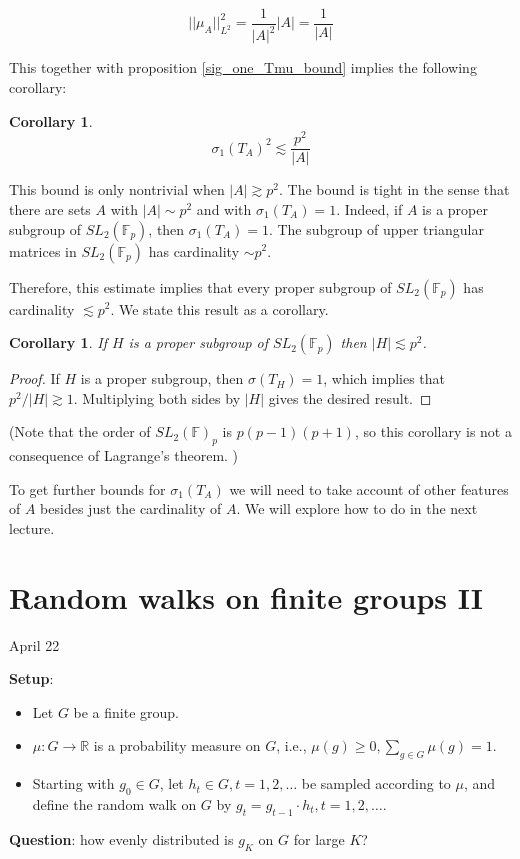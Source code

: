 \documentclass[12pt]{amsart}
\newtheorem{corollary}[theorem]{Corollary}
\newcommand{\FF}{\mathbb{F}}
\begin{document}
\[ ||\mu_A||_{L^2}^2 = \frac{1}{|A|^2} |A| = \frac{1}{|A|} \] 

This together with proposition \ref{sig_one_Tmu_bound} implies the following corollary: 

\begin{corollary}
\[\sigma_1(T_A)^2 \lesssim \frac{p^2}{|A|} \]
\end{corollary}

This bound is only nontrivial when $|A| \gtrsim p^2$.   The bound is tight in the sense that there are sets $A$ with $|A| \sim p^2$ and with $\sigma_1(T_A) = 1$.   Indeed,  if $A$ is a proper subgroup of $SL_2(\FF_p)$,  then $\sigma_1(T_A) = 1$.   The subgroup of upper triangular matrices in $SL_2(\FF_p)$ has cardinality $\sim p^2$. 

Therefore,  this estimate implies that every proper subgroup of $SL_2(\FF_p)$ has cardinality $\lesssim p^2$.   We state this result as a corollary.

\begin{corollary}
If $H$ is a proper subgroup of $SL_2(\mathbb{F}_p)$ then $|H| \lesssim p^2$. 
\end{corollary}
\begin{proof}
If $H$ is a proper subgroup, then $\sigma(T_H) = 1$, which implies that $p^2/|H| \gtrsim 1$. Multiplying both sides by $|H|$ gives the desired result. 
\end{proof}

(Note that the order of $SL_2(\mathbb{F})_p$ is $p(p-1)(p+1)$, so this corollary is not a consequence of Lagrange's theorem. )

To get further bounds for $\sigma_1(T_A)$ we will need to take account of other features of $A$ besides just the cardinality of $A$.   We will explore how to do in the next lecture.


\newpage


\section{Random walks on finite groups II}

April 22

\noindent\textbf{Setup}:
\begin{itemize}
    \item Let $G$ be a finite group.
    \item $\mu:G\to \mathbb R$ is a probability measure on $G$, i.e., $\mu(g)\ge 0,\sum_{g\in G}\mu(g)=1$.
    \item Starting with $g_0\in G$, let $h_t\in G,t=1,2,\dots$ be sampled according to $\mu$, and define the random walk on $G$ by $g_t=g_{t-1}\cdot h_t,t=1,2,\dots$. 
\end{itemize}
\noindent\textbf{Question}: how evenly distributed is $g_K$ on $G$ for large $K$?
\end{document}
